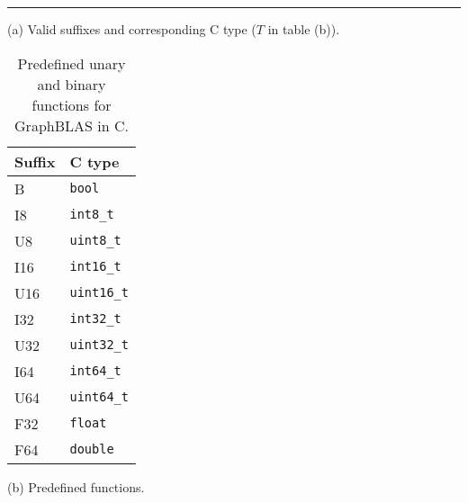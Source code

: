 \begin{table}
\hrule
\begin{center}
\caption{Predefined unary and binary functions for GraphBLAS in C.}
\label{Tab:PredefinedFunctions}

\vspace{1\baselineskip}
(a) Valid suffixes and corresponding C type ($T$ in table (b)).
\vspace{1\baselineskip}

\begin{tabular}{l|l}
Suffix		& C type \\ \hline
{\sf B}		& {\tt bool} \\
{\sf I8}	& {\tt int8\_t} \\
{\sf U8}	& {\tt uint8\_t} \\
{\sf I16}	& {\tt int16\_t} \\
{\sf U16}	& {\tt uint16\_t} \\
{\sf I32}	& {\tt int32\_t} \\
{\sf U32}	& {\tt uint32\_t} \\
{\sf I64}	& {\tt int64\_t} \\
{\sf U64}	& {\tt uint64\_t} \\
{\sf F32}	& {\tt float} \\
{\sf F64}	& {\tt double} \\
\end{tabular}

\vspace{1\baselineskip}
(b) Predefined functions.
\vspace{1\baselineskip}


\end{center}
\end{table}
